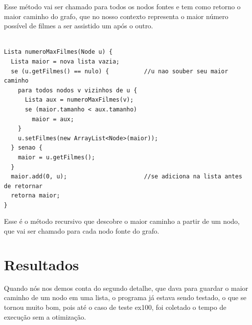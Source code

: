 \documentclass[12pt]{article}
\begin{document}
Esse método vai ser chamado para todos os nodos fontes e tem como retorno o
maior caminho do grafo, que no nosso contexto representa o maior número possível
de filmes a ser assistido um após o outro.

\vspace{5.0cm}

\begin{lstlisting}

Lista numeroMaxFilmes(Node u) {
  Lista maior = nova lista vazia;
  se (u.getFilmes() == nulo) {          //u nao souber seu maior caminho
    para todos nodos v vizinhos de u {
      Lista aux = numeroMaxFilmes(v);
      se (maior.tamanho < aux.tamanho)
        maior = aux;
    }
    u.setFilmes(new ArrayList<Node>(maior));
  } senao {
    maior = u.getFilmes();
  }
  maior.add(0, u);                      //se adiciona na lista antes de retornar
  retorna maior;
}  

\end{lstlisting}

Esse é o método recursivo que descobre o maior caminho a partir de um nodo, que
vai ser chamado para cada nodo fonte do grafo.

\section{Resultados}

Quando nós nos demos conta do segundo detalhe, que dava para guardar o maior
caminho de um nodo em uma lista, o programa já estava sendo testado, o que se
tornou muito bom, pois até o caso de teste ex100, foi coletado o tempo de
execução sem a otimização.
\end{document}
